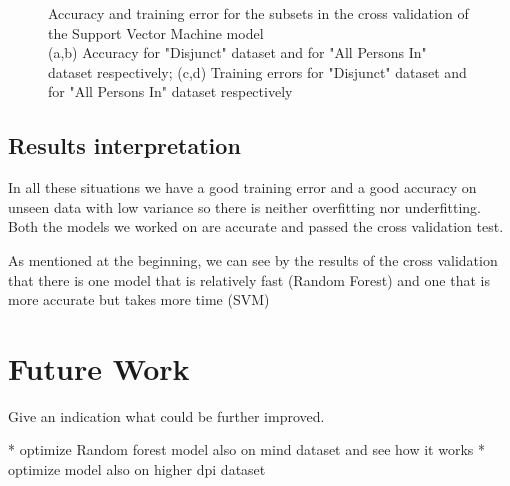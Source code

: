 \documentclass[conference]{IEEEtran}
\begin{document}
\begin{figure}[ht!]
    \caption{
        \color{baptiste}
        Accuracy and training error for the subsets in the cross validation of the Support Vector Machine model \\ 
        (a,b) Accuracy for "Disjunct" dataset and for "All Persons In" dataset respectively;
        (c,d) Training errors for "Disjunct" dataset and for "All Persons In" dataset respectively
    }
    \label{fig:hyper:cv_SVM}
\end{figure}

\subsection{Results interpretation}

\textcolor{baptiste}{In all these situations we have a good training error and a good accuracy on unseen data with low variance so there is neither overfitting nor underfitting. Both the models we worked on are accurate and passed the cross validation test.}

\textcolor{baptiste}{As mentioned at the beginning, we can see by the results of the cross validation that there is one model that is relatively fast (Random Forest) and one that is more accurate but takes more time (SVM)}

\section{Future Work}
Give an indication what could be further improved. 

* optimize Random forest model also on mind dataset and see how it works
* optimize model also on higher dpi dataset




\end{document}
